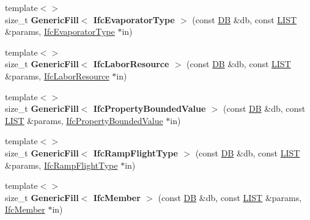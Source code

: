 \begin{DoxyCompactItemize}
\item 
\hypertarget{namespace_assimp_1_1_s_t_e_p_a0ef916ae9e99863160bf813f08e87b95}{{\footnotesize template$<$$>$ }\\size\+\_\+t {\bfseries Generic\+Fill$<$ Ifc\+Evaporator\+Type $>$} (const \hyperlink{class_assimp_1_1_s_t_e_p_1_1_d_b}{D\+B} \&db, const \hyperlink{class_assimp_1_1_s_t_e_p_1_1_e_x_p_r_e_s_s_1_1_l_i_s_t}{L\+I\+S\+T} \&params, \hyperlink{struct_assimp_1_1_i_f_c_1_1_ifc_evaporator_type}{Ifc\+Evaporator\+Type} $\ast$in)}\label{namespace_assimp_1_1_s_t_e_p_a0ef916ae9e99863160bf813f08e87b95}

\item 
\hypertarget{namespace_assimp_1_1_s_t_e_p_a4ffd6c825d1b06dd1b64ab917d248f84}{{\footnotesize template$<$$>$ }\\size\+\_\+t {\bfseries Generic\+Fill$<$ Ifc\+Labor\+Resource $>$} (const \hyperlink{class_assimp_1_1_s_t_e_p_1_1_d_b}{D\+B} \&db, const \hyperlink{class_assimp_1_1_s_t_e_p_1_1_e_x_p_r_e_s_s_1_1_l_i_s_t}{L\+I\+S\+T} \&params, \hyperlink{struct_assimp_1_1_i_f_c_1_1_ifc_labor_resource}{Ifc\+Labor\+Resource} $\ast$in)}\label{namespace_assimp_1_1_s_t_e_p_a4ffd6c825d1b06dd1b64ab917d248f84}

\item 
\hypertarget{namespace_assimp_1_1_s_t_e_p_ab05d5c7b64e0c50ffed5f3be056a6e53}{{\footnotesize template$<$$>$ }\\size\+\_\+t {\bfseries Generic\+Fill$<$ Ifc\+Property\+Bounded\+Value $>$} (const \hyperlink{class_assimp_1_1_s_t_e_p_1_1_d_b}{D\+B} \&db, const \hyperlink{class_assimp_1_1_s_t_e_p_1_1_e_x_p_r_e_s_s_1_1_l_i_s_t}{L\+I\+S\+T} \&params, \hyperlink{struct_assimp_1_1_i_f_c_1_1_ifc_property_bounded_value}{Ifc\+Property\+Bounded\+Value} $\ast$in)}\label{namespace_assimp_1_1_s_t_e_p_ab05d5c7b64e0c50ffed5f3be056a6e53}

\item 
\hypertarget{namespace_assimp_1_1_s_t_e_p_a1871c472a8a4217d552686d4cd5217de}{{\footnotesize template$<$$>$ }\\size\+\_\+t {\bfseries Generic\+Fill$<$ Ifc\+Ramp\+Flight\+Type $>$} (const \hyperlink{class_assimp_1_1_s_t_e_p_1_1_d_b}{D\+B} \&db, const \hyperlink{class_assimp_1_1_s_t_e_p_1_1_e_x_p_r_e_s_s_1_1_l_i_s_t}{L\+I\+S\+T} \&params, \hyperlink{struct_assimp_1_1_i_f_c_1_1_ifc_ramp_flight_type}{Ifc\+Ramp\+Flight\+Type} $\ast$in)}\label{namespace_assimp_1_1_s_t_e_p_a1871c472a8a4217d552686d4cd5217de}

\item 
\hypertarget{namespace_assimp_1_1_s_t_e_p_a16b54fa74133d3434c9253d402a3760c}{{\footnotesize template$<$$>$ }\\size\+\_\+t {\bfseries Generic\+Fill$<$ Ifc\+Member $>$} (const \hyperlink{class_assimp_1_1_s_t_e_p_1_1_d_b}{D\+B} \&db, const \hyperlink{class_assimp_1_1_s_t_e_p_1_1_e_x_p_r_e_s_s_1_1_l_i_s_t}{L\+I\+S\+T} \&params, \hyperlink{struct_assimp_1_1_i_f_c_1_1_ifc_member}{Ifc\+Member} $\ast$in)}\label{namespace_assimp_1_1_s_t_e_p_a16b54fa74133d3434c9253d402a3760c}


\end{DoxyCompactItemize}
